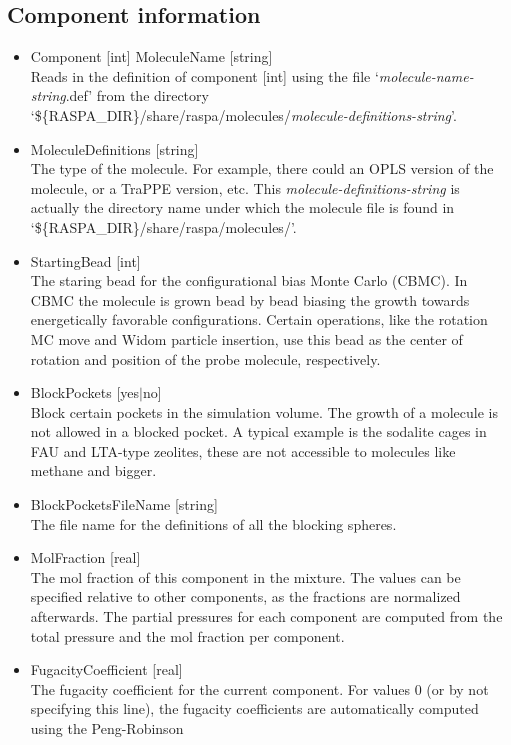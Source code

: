 \subsection*{Component information}
\begin{itemize}
\item{Component [int] MoleculeName [string]}\\
Reads in the definition of component [int] using the file `\emph{molecule-name-string}.def' from the 
directory `\$\{RASPA\_DIR\}/share/raspa/molecules/\emph{molecule-definitions-string}'.
\item{MoleculeDefinitions [string]}\\
The type of the molecule. For example, there could an OPLS version of the molecule, or a TraPPE version, etc. This \emph{molecule-definitions-string} is actually the directory name
under which the molecule file is found in `\$\{RASPA\_DIR\}/share/raspa/molecules/'.
\item{StartingBead [int]}\\
The staring bead for the configurational bias Monte Carlo (CBMC). In CBMC the molecule is grown bead by bead biasing the growth towards energetically favorable configurations.
Certain operations, like the rotation MC move and Widom particle insertion, use this bead as the center of rotation and position of the probe molecule, respectively.
\item{BlockPockets [yes$|$no]}\\
Block certain pockets in the simulation volume. The growth of a molecule is not allowed in a blocked pocket. A typical example is the sodalite cages in FAU and LTA-type zeolites,
these are not accessible to molecules like methane and bigger.
\item{BlockPocketsFileName [string]}\\
The file name for the definitions of all the blocking spheres.
\item{MolFraction [real]}\\
The mol fraction of this component in the mixture. The values can be specified relative to other components, as the fractions are normalized afterwards.
The partial pressures for each component are computed from the total pressure and the mol fraction per component.
\item{FugacityCoefficient [real]}\\
The fugacity coefficient for the current component. For values 0 (or by not specifying this line), the fugacity coefficients are automatically computed using the Peng-Robinson

\end{itemize}

